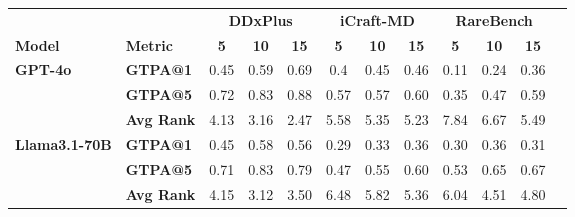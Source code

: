 \setlength{\tabcolsep}{1.7pt}
\begin{table}[t]
    \centering
    \scriptsize{%
    \begin{tabular}{llcccccccccc}
    \toprule
     &  & \multicolumn{3}{c}{\textbf{DDxPlus}} & \multicolumn{3}{c}{\textbf{iCraft-MD}} & \multicolumn{3}{c}{\textbf{RareBench}} \\
    \cmidrule(lr){3-5} \cmidrule(lr){6-8} \cmidrule(lr){9-11}
    \textbf{Model} & \textbf{Metric} & \textbf{5} & \textbf{10} & \textbf{15} & \textbf{5} & \textbf{10} & \textbf{15} & \textbf{5} & \textbf{10} & \textbf{15} \\
    \midrule
    \multirow{2}{*}{\textbf{GPT-4o}}
    & \textbf{GTPA@1} & 0.45 & 0.59 & 0.69 & 0.4 & 0.45 & 0.46 & 0.11 & 0.24 & 0.36 \\
    & \textbf{GTPA@5} & 0.72 & 0.83 & 0.88 & 0.57 & 0.57 & 0.60 & 0.35 & 0.47 & 0.59 \\
    & \textbf{Avg Rank} & 4.13 & 3.16 & 2.47 & 5.58 & 5.35 & 5.23 & 7.84 & 6.67 & 5.49 \\
    \midrule
    \multirow{2}{*}{\textbf{Llama3.1-70B}}
    & \textbf{GTPA@1} & 0.45 & 0.58 & 0.56 & 0.29 & 0.33 & 0.36 & 0.30 & 0.36 & 0.31 \\
    & \textbf{GTPA@5} & 0.71 & 0.83 & 0.79 & 0.47 & 0.55 & 0.60 & 0.53 & 0.65 & 0.67 \\
    & \textbf{Avg Rank} & 4.15 & 3.12 & 3.50 & 6.48 & 5.82 & 5.36 & 6.04 & 4.51 & 4.80 \\

\end{tabular}}
\end{table}
